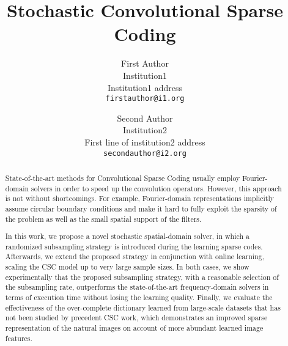 \documentclass[10pt,twocolumn,letterpaper]{article}
\begin{document}
\title{Stochastic Convolutional Sparse Coding}

\author{First Author\\
Institution1\\
Institution1 address\\
{\tt\small firstauthor@i1.org}
\and
Second Author\\
Institution2\\
First line of institution2 address\\
{\tt\small secondauthor@i2.org}
}

\maketitle

\begin{abstract}
  State-of-the-art methods for Convolutional Sparse Coding usually
  employ Fourier-domain solvers in order to speed up the convolution
  operators. However, this approach is not without shortcomings. For
  example, Fourier-domain representations implicitly assume circular
  boundary conditions and make it hard to fully exploit the sparsity
  of the problem as well as the small spatial support of the filters.


  In this work, we propose a novel stochastic spatial-domain solver,
  in which a randomized subsampling strategy is introduced during the
  learning sparse codes. Afterwards, we extend the proposed strategy
  in conjunction with online learning, scaling the CSC model up to
  very large sample sizes. In both cases, we show experimentally that
  the proposed subsampling strategy, with a reasonable selection of
  the subsampling rate, outperforms the state-of-the-art
  frequency-domain solvers in terms of execution time without losing
  the learning quality. Finally, we evaluate the effectiveness of the
  over-complete dictionary learned from large-scale datasets that has
  not been studied by precedent CSC work, which demonstrates an
  improved sparse representation of the natural images on account of
  more abundant learned image features.
\end{abstract}











{\small


}

\clearpage
\appendix


\end{document}
